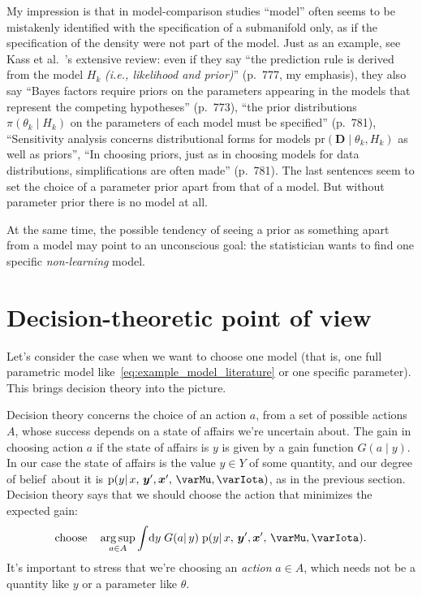 \documentclass[\ifafour a4paper,12pt,\else a5paper,10pt,\fi%
onecolumn,oneside,article,%
british%
]{memoir}
\theoremstyle{remark}
\theoremstyle{innote}
\newcommand*{\citep}{\parencites}
\newcommand*{\citey}{\parencites*}
\newcommand*{\di}{\mathrm{d}}%
\newcommand*{\pf}{\mathrm{p}}%
\renewcommand*{\|}{\mathpunct{|}}
\newcommand*{\chaps}{chs}%
\newcommand*{\etal}{{et al.}}
\DeclareMathOperator*{\argsup}{arg\,sup}
\newcommand*{\dob}{degree of belief}
\newcommand*{\yM}{\varMu}
\newcommand*{\yA}{A}
\newcommand*{\yY}{Y}
\newcommand*{\yx}{\bm{x}}
\newcommand*{\yy}{\bm{y}}
\newcommand*{\yI}{\varIota}
\newcommand*{\yg}{G}
\begin{document}
My impression is that in model-comparison studies \enquote{model} often
seems to be mistakenly identified with the specification of a submanifold
only, as if the specification of the density were not part of the model.
Just as an example, see Kass \etal\ \citey{kassetal1995}'s extensive
review: even if they say \enquote{the prediction rule is derived from the
  model $H_k$ \emph{(i.e., likelihood and prior)}} (p.~777, my emphasis),
they also say \enquote{Bayes factors require priors on the parameters
  appearing in the models that represent the competing hypotheses}
(p.~773), \enquote{the prior distributions $\pi(\theta_k \| H_k)$ on the
  parameters of each model must be specified} (p.~781),
\enquote{Sensitivity analysis concerns distributional forms for models
  $\mathrm{pr}(\mathbf{D} \| \theta_k, H_k)$ as well as priors},
\enquote{In choosing priors, just as in choosing models for data
  distributions, simplifications are often made} (p.~781). The last
sentences seem to set the choice of a parameter prior apart from that of a
model. But without parameter prior there is no model at all.

At the same time, the possible tendency of seeing a prior as something apart
from a model may point to an unconscious goal: the statistician wants to
find one specific \emph{non-learning} model.

\section{Decision-theoretic point of view}
\label{sec:decision_theory_view}

Let's consider the case when we want to choose one model (that is, one full
parametric model like~\eqref{eq:example_model_literature} or one specific
parameter). This brings decision theory
\citep{raiffaetal1961_r2000,berger1980_r1985}[\chaps~13--14]{jaynes1994_r2003}
into the picture.

Decision theory concerns the choice of an action $a$, from a set of
possible actions $\yA$, whose success depends on a state of affairs we're
uncertain about. The gain in choosing action $a$ if the state of affairs is
$y$ is given by a gain function $\yg(a \| y)$. In our case the state of
affairs is the value $y \in \yY$ of some quantity, and our \dob\ about it
is $\pf(y \| x,\, \yy',\yx',\, \yM, \yI)$, as in the previous section.
Decision theory says that we should choose the action that minimizes the
expected gain:
\begin{equation}
  \label{eq:decision_theory_choice}
  \text{choose} \quad
  \argsup_{a \in \yA}
  \int\!\di y\; \yg(a \| y)\; \pf(y \| x,\, \yy',\yx',\, \yM, \yI).
\end{equation}
It's important to stress that we're choosing an \emph{action} $a \in \yA$,
which needs not be a quantity like $y$ or a parameter like $\theta$.
\end{document}
